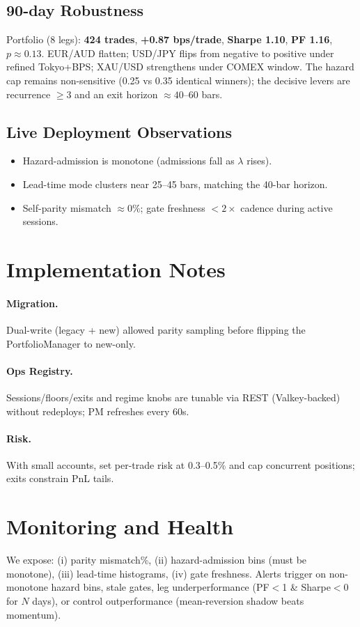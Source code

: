 \documentclass[11pt]{article}
\begin{document}
\subsection{90-day Robustness}
Portfolio (8 legs): \textbf{424 trades}, \textbf{+0.87 bps/trade}, \textbf{Sharpe 1.10}, \textbf{PF 1.16}, $p\approx0.13$.
EUR/AUD flatten; USD/JPY flips from negative to positive under refined Tokyo+BPS; XAU/USD strengthens under COMEX window.
The hazard cap remains non-sensitive (0.25 vs 0.35 identical winners); the decisive levers are recurrence $\ge 3$ and
an exit horizon $\approx40$--$60$ bars.

\subsection{Live Deployment Observations}
\begin{itemize}[leftmargin=1.3em]
\item Hazard-admission is monotone (admissions fall as $\lambda$ rises).
\item Lead-time mode clusters near 25--45 bars, matching the 40-bar horizon.
\item Self-parity mismatch $\approx 0\%$; gate freshness $<2\times$ cadence during active sessions.
\end{itemize}

\section{Implementation Notes}
\paragraph{Migration.} Dual-write (legacy + new) allowed parity sampling before flipping the PortfolioManager to new-only.
\paragraph{Ops Registry.} Sessions/floors/exits and regime knobs are tunable via REST (Valkey-backed) without redeploys; PM refreshes every 60s.
\paragraph{Risk.} With small accounts, set per-trade risk at 0.3--0.5\% and cap concurrent positions; exits constrain PnL tails.

\section{Monitoring and Health}
We expose:
(i) parity mismatch\%, (ii) hazard-admission bins (must be monotone), (iii) lead-time histograms,
(iv) gate freshness. Alerts trigger on non-monotone hazard bins, stale gates, leg underperformance
(PF$<$1 \& Sharpe$<$0 for $N$ days), or control outperformance (mean-reversion shadow beats momentum).
\end{document}
